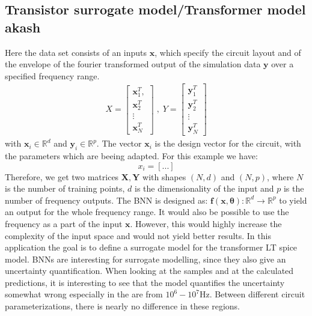 \documentclass{article}
\begin{document}
\subsection{Transistor surrogate model/Transformer model akash}
Here the data set consists of an inputs $ \bm x$, which specify the circuit layout and of the envelope of the fourier transformed output of the simulation data $\bm y$ over a specified frequency range.
\begin{align}
    X = \begin{bmatrix}
        \bm x_1^T, \\
        \bm x_2^T\\
        \vdots\\
        \bm x_N^T
        \end{bmatrix} \;, \;
    Y = \begin{bmatrix}
        \bm y_1^T\\
        \bm y_2^T\\
        \vdots\\
        \bm y_N^T
    \end{bmatrix}
\end{align}
with $\bm x_i \in \mathbb{R}^d$ and $\bm y_i \in \mathbb{R}^{p}$. The vector $\bm x_i$ is the design vector for the circuit, with the parameters which are beeing adapted. For this example we have:
\begin{equation}
    x_i = [...]
\end{equation}Therefore, we get two matrices $\bm X, \bm Y$ with shapes $(N, d)$ and $(N, p)$, where $N$ is the number of training points, $d$ is the dimensionality of the input and $p$ is the number of frequency outputs. The BNN is designed as: $\bm f(\bm x, \bm \theta): \mathbb{R}^d \rightarrow \mathbb{R}^p$ to yield an output for the whole frequency range. It would also be possible to use the frequency as a part of the input $\bm x$. However, this would highly increase the complexity of the input space and would not yield better results. In this application the goal is to define a surrogate model for the transformer LT spice model. BNNs are interesting for surrogate modelling, since they also give an uncertainty quantification. When looking at the samples and at the calculated predictions, it is interesting to see that the model quantifies the uncertainty somewhat wrong especially in the are from $10^6 - 10^7 $Hz. Between different circuit parameterizations, there is nearly no difference in these regions.
\end{document}
